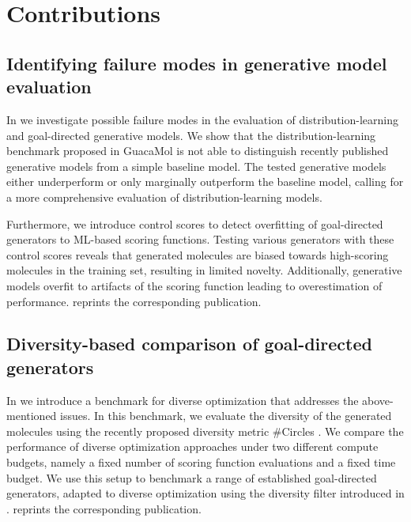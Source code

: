 \section{Contributions\label{sec:contributions}}
\subsection{Identifying failure modes in generative model evaluation}
In \citep{renzFailureModesMolecule2019} we investigate possible failure modes in the evaluation of
distribution-learning and goal-directed generative models. We show that the distribution-learning
benchmark proposed in GuacaMol \citep{brownGuacaMolBenchmarkingModels2019} is not able to
distinguish recently published generative models from a simple baseline model. The tested generative
models either underperform or only marginally outperform the baseline model, calling for a more
comprehensive evaluation of distribution-learning models.

Furthermore, we introduce control scores to detect overfitting of goal-directed generators to
\ac{ML}-based scoring functions. Testing various generators with these control scores reveals that
generated molecules are biased towards high-scoring molecules in the training set, resulting in
limited novelty. Additionally, generative models overfit to artifacts of the scoring function
leading to overestimation of performance.  reprints the corresponding
publication.

\subsection{Diversity-based comparison of goal-directed generators\label{sec:divopt}} In
\citep{renzDiverseHitsNovo2024} we introduce a benchmark for diverse optimization that addresses the
above-mentioned issues. In this benchmark, we evaluate the diversity of the generated molecules
using the recently proposed diversity metric \#Circles \citep{xieHowMuchSpace2023}. We compare the
performance of diverse optimization approaches under two different compute budgets, namely a fixed
number of scoring function evaluations and a fixed time budget. We use this setup to benchmark a
range of established goal-directed generators, adapted to diverse optimization using the diversity
filter introduced in \citep{blaschkeMemoryassistedReinforcementLearning2020}.
 reprints the corresponding publication.

